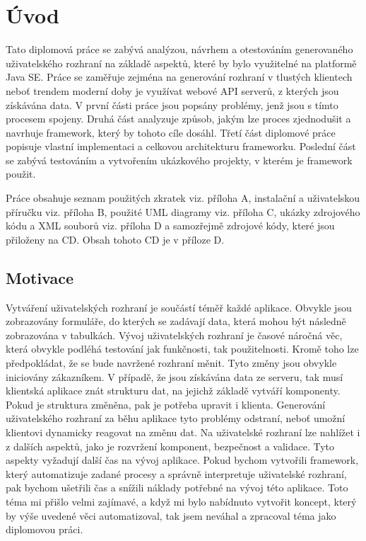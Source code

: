 \chapter{Úvod}
Tato diplomová práce se zabývá analýzou, návrhem a otestováním generovaného uživatelského rozhraní na základě aspektů, které by bylo využitelné na platformě Java SE. Práce se zaměřuje zejména na generování rozhraní v tlustých klientech neboť trendem moderní doby je využívat webové API serverů, z kterých jsou získávána data. V první části práce jsou popsány problémy, jenž jsou s tímto procesem spojeny. Druhá část analyzuje způsob, jakým lze proces zjednodušit a navrhuje framework, který by tohoto cíle dosáhl. Třetí část diplomové práce popisuje vlastní implementaci a celkovou architekturu frameworku. Poslední část se zabývá testováním a vytvořením ukázkového projekty, v kterém je framework použit.

Práce obsahuje seznam použitých zkratek viz. příloha A, instalační a uživatelskou příručku viz. příloha B, použité UML diagramy viz. příloha C, ukázky zdrojového kódu a XML souborů viz. příloha D a samozřejmě zdrojové kódy, které jsou přiloženy na CD. Obsah tohoto CD je v příloze D.
\section{Motivace}
Vytváření uživatelských rozhraní je součástí téměř každé aplikace. Obvykle jsou zobrazovány formuláře, do kterých se zadávají data, která mohou být následně zobrazována v tabulkách. Vývoj uživatelských rozhraní je časové náročná věc, která obvykle podléhá testování jak funkčnosti, tak použitelnosti. Kromě toho lze předpokládat, že se bude navržené rozhraní měnit. Tyto změny jsou obvykle iniciovány zákazníkem. V případě, že jsou získávána data ze serveru, tak musí klientská aplikace znát strukturu dat, na jejichž základě vytváří komponenty. Pokud je struktura změněna, pak je potřeba upravit i klienta. Generování uživatelského rozhraní za běhu aplikace tyto problémy odstraní, neboť umožní klientovi dynamicky reagovat na změnu dat. Na uživatelské rozhraní lze nahlížet i z dalších aspektů, jako je rozvržení komponent, bezpečnost a validace. Tyto aspekty vyžadují další čas na vývoj aplikace. Pokud bychom vytvořili framework, který automatizuje zadané procesy a správně interpretuje uživatelské rozhraní, pak bychom ušetřili čas a snížili náklady potřebné na vývoj této aplikace. Toto téma mi přišlo velmi zajímavé, a když mi bylo nabídnuto vytvořit koncept, který by výše uvedené věci automatizoval, tak jsem neváhal a zpracoval téma jako diplomovou práci.
